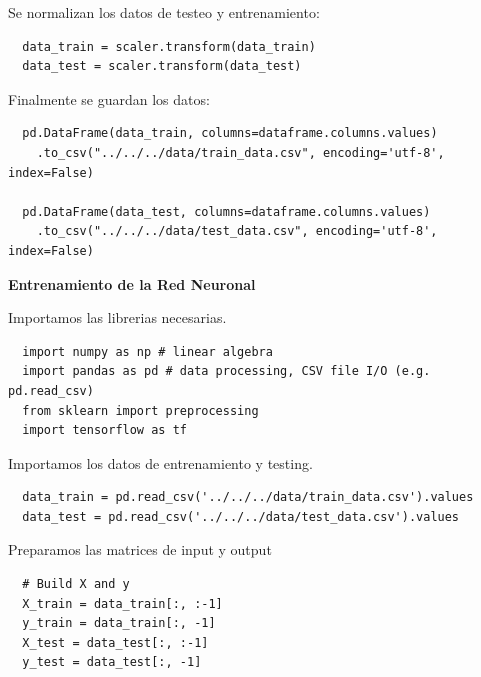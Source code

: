\documentclass[osajnl,twocolumn,showpacs,superscriptaddress,10pt]{revtex4-1} %
\begin{document}
Se normalizan los datos de testeo y entrenamiento:

\begin{verbatim}
  data_train = scaler.transform(data_train)
  data_test = scaler.transform(data_test)
\end{verbatim}

Finalmente se guardan los datos:

\begin{verbatim}
  pd.DataFrame(data_train, columns=dataframe.columns.values)
    .to_csv("../../../data/train_data.csv", encoding='utf-8', index=False)

  pd.DataFrame(data_test, columns=dataframe.columns.values)
    .to_csv("../../../data/test_data.csv", encoding='utf-8', index=False)
\end{verbatim}

\clearpage

\textbf{Entrenamiento de la Red Neuronal}

Importamos las librerias necesarias.

\begin{verbatim}
  import numpy as np # linear algebra
  import pandas as pd # data processing, CSV file I/O (e.g. pd.read_csv)
  from sklearn import preprocessing
  import tensorflow as tf
\end{verbatim}

Importamos los datos de entrenamiento y testing.

\begin{verbatim}
  data_train = pd.read_csv('../../../data/train_data.csv').values
  data_test = pd.read_csv('../../../data/test_data.csv').values
\end{verbatim}

Preparamos las matrices de input y output

\begin{verbatim}
  # Build X and y
  X_train = data_train[:, :-1]
  y_train = data_train[:, -1]
  X_test = data_test[:, :-1]
  y_test = data_test[:, -1]
\end{verbatim}
\end{document}
